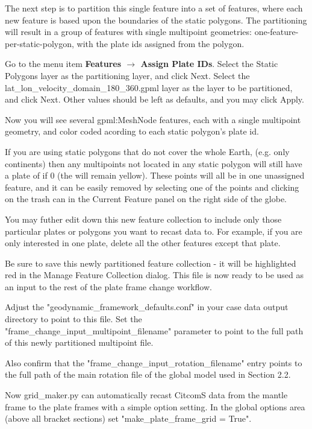 \documentclass[letterpaper,12pt]{article}
\newcommand{\gp}[1]{\textbf{#1}}
\begin{document}
The next step is to partition this single feature into a set of features, 
where each new feature is based upon the boundaries of the static polygons.
The partitioning will result in a group of features with single multipoint geometries: 
one-feature-per-static-polygon, with the plate ids assigned from the polygon.

Go to the menu item \gp{Features $\rightarrow$ Assign Plate IDs}.
Select the Static Polygons layer as the partitioning layer, and click Next.
Select the lat\_lon\_velocity\_domain\_180\_360.gpml layer as the layer to be partitioned, and click Next.
Other values should be left as defaults, and you may click Apply.

Now you will see several gpml:MeshNode features, each with a single multipoint geometry, and color coded acording 
to each static polygon's plate id.

If you are using static polygons that do not cover the whole Earth, (e.g. only continents) 
then any multipoints not located in any static polygon will still have a plate of if 0 (the will remain yellow). 
These points will all be in one unassigned feature, and it can be easily removed by selecting one of the points 
and clicking on the trash can in the Current Feature panel on the right side of the globe.

You may futher edit down this new feature collection to include only those particular plates or polygons you want to recast data to.
For example, if you are only interested in one plate, delete all the other features except that plate.

Be sure to save this newly partitioned feature collection - it will be highlighted red in the Manage Feature Collection dialog.
This file is now ready to be used as an input to the rest of the plate frame change workflow.

Adjust the "geodynamic\_framework\_defaults.conf" in your case data output directory to point to this file.
Set the "frame\_change\_input\_multipoint\_filename" parameter to point to the full path of this newly partitioned multipoint file.

Also confirm that the "frame\_change\_input\_rotation\_filename" entry points to the full path of the main rotation file
of the global model used in Section 2.2.

Now grid\_maker.py can automatically recast CitcomS data from the mantle frame to the plate frames with a simple option setting.  
In the global options area (above all bracket sections) set "make\_plate\_frame\_grid = True".
\end{document}
